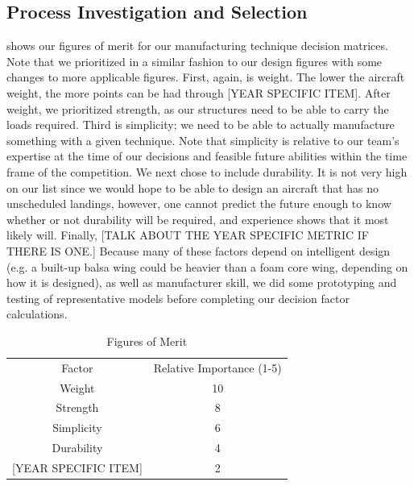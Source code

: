 \documentclass[report]{byu-aero}
\begin{document}
\subsection{Process Investigation and Selection}
\label{ssec:processselection}

 shows our figures of merit for our manufacturing technique decision matrices.  Note that we prioritized in a similar fashion to our design figures with some changes to more applicable figures.  First, again, is weight.  The lower the aircraft weight, the more points can be had through {\color{\BYUred} {\color{BYUred} [YEAR SPECIFIC ITEM]}}.  After weight, we prioritized strength, as our structures need to be able to carry the loads required.  Third is simplicity; we need to be able to actually manufacture something with a given technique.  Note that simplicity is relative to our team's expertise at the time of our decisions and feasible future abilities within the time frame of the competition.  We next chose to include durability.  It is not very high on our list since we would hope to be able to design an aircraft that has no unscheduled landings, however, one cannot predict the future enough to know whether or not durability will be required, and experience shows that it most likely will.  Finally, {\color{\BYUred}[TALK ABOUT THE YEAR SPECIFIC METRIC IF THERE IS ONE.]} Because many of these factors depend on intelligent design (e.g. a built-up balsa wing could be heavier than a foam core wing, depending on how it is designed), as well as manufacturer skill, we did some prototyping and testing of representative models before completing our decision factor calculations.


\begin{table}[h!]
	\centering
	\caption{Figures of Merit}
	\label{tab:fomman}
	\begin{tabular}{ c c } 

		\rowcolor{BYUbluemid}
		Factor & Relative Importance (1-5) \\

		Weight & 10 \\

		Strength & 8 \\

		Simplicity & 6 \\

		Durability & 4 \\

		{\color{\BYUred} {\color{BYUred} [YEAR SPECIFIC ITEM]}} & 2 \\

	\end{tabular}
\end{table}
\end{document}
